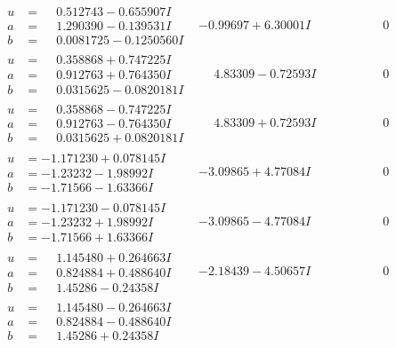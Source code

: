 \documentclass[1p]{elsarticle_modified}
\theoremstyle{definition}
\begin{document}
$$\begin{array}{c|c|c}
\begin{aligned}
u &= \phantom{-}0.512743 - 0.655907 I \\
a &= \phantom{-}1.290390 - 0.139531 I \\
b &= \phantom{-}0.0081725 - 0.1250560 I\end{aligned}
 & -0.99697 + 6.30001 I & \phantom{-0.000000 } 0 \\ \hline\begin{aligned}
u &= \phantom{-}0.358868 + 0.747225 I \\
a &= \phantom{-}0.912763 + 0.764350 I \\
b &= \phantom{-}0.0315625 - 0.0820181 I\end{aligned}
 & \phantom{-}4.83309 - 0.72593 I & \phantom{-0.000000 } 0 \\ \hline\begin{aligned}
u &= \phantom{-}0.358868 - 0.747225 I \\
a &= \phantom{-}0.912763 - 0.764350 I \\
b &= \phantom{-}0.0315625 + 0.0820181 I\end{aligned}
 & \phantom{-}4.83309 + 0.72593 I & \phantom{-0.000000 } 0 \\ \hline\begin{aligned}
u &= -1.171230 + 0.078145 I \\
a &= -1.23232 - 1.98992 I \\
b &= -1.71566 - 1.63366 I\end{aligned}
 & -3.09865 + 4.77084 I & \phantom{-0.000000 } 0 \\ \hline\begin{aligned}
u &= -1.171230 - 0.078145 I \\
a &= -1.23232 + 1.98992 I \\
b &= -1.71566 + 1.63366 I\end{aligned}
 & -3.09865 - 4.77084 I & \phantom{-0.000000 } 0 \\ \hline\begin{aligned}
u &= \phantom{-}1.145480 + 0.264663 I \\
a &= \phantom{-}0.824884 + 0.488640 I \\
b &= \phantom{-}1.45286 - 0.24358 I\end{aligned}
 & -2.18439 - 4.50657 I & \phantom{-0.000000 } 0 \\ \hline\begin{aligned}
u &= \phantom{-}1.145480 - 0.264663 I \\
a &= \phantom{-}0.824884 - 0.488640 I \\
b &= \phantom{-}1.45286 + 0.24358 I\end{aligned}

\end{array}$$
\end{document}
